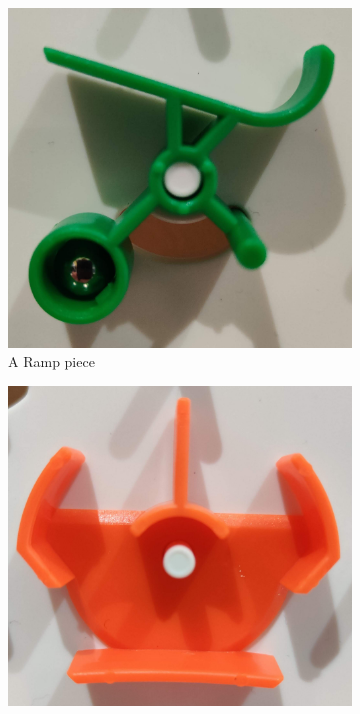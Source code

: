\documentclass{l4proj}
\begin{document}
\begin{figure}
    \centering
    \begin{subfigure}[b]{0.20\textwidth}
        \includegraphics[width=\textwidth]{images/ramp.pdf}
        \caption{A Ramp piece \\}
        \label{fig:phyRamp}
    \end{subfigure}
    \begin{subfigure}[b]{0.20\textwidth}
        \includegraphics[width=\textwidth]{images/crossover.pdf}

\end{subfigure}
\end{figure}
\end{document}
